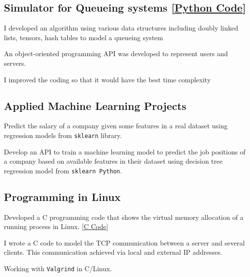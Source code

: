 \documentclass[letter,10pt]{article}
\begin{document}
	
	\subsection{Simulator for Queueing systems [\href{https://github.com/Hadi2525/queueing_theory}{Python Code}]}
	\begin{zitemize}
		\item I developed an algorithm using various data structures including doubly linked lists, tensors, hash tables to model a queueing system
		\item An object-oriented programming API was developed to represent users and servers.
		\item I improved the coding so that it would have the best time complexity 
	\end{zitemize}

	\subsection{Applied Machine Learning Projects}
	\begin{zitemize}
		\item Predict the salary of a company given some features in a real dataset using regression models from \texttt{sklearn} library.
		\item Develop an API to train a machine learning model to predict the job positions of a company based on available features in their dataset using decision tree regression model from \texttt{sklearn Python}.
	\end{zitemize}

	\subsection{Programming in Linux }
	\begin{zitemize}
		\item Developed a C programming code that shows the virtual memory allocation of a running process in Linux. [\href{https://github.com/Hadi2525/vmemory_maps}{C Code}]
		\item I wrote a C code to model the TCP communication between a server and several clients. This communication achieved via local and external IP addresses.
		\item Working with \texttt{Valgrind} in C/Linux.
	\end{zitemize}
	
\end{document}
